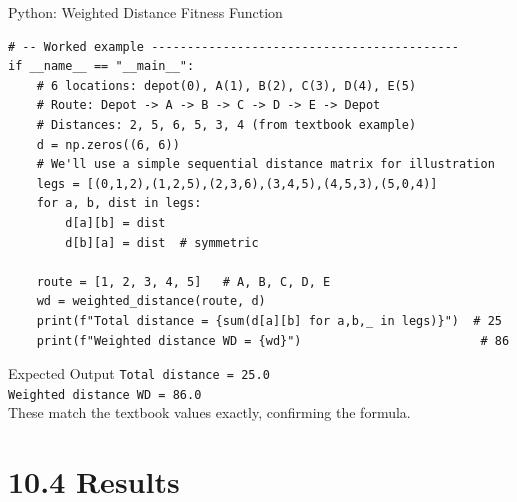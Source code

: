 \documentclass[aspectratio=169,10pt]{beamer}
\begin{document}
\begin{frame}[fragile]{Python: Weighted Distance Fitness Function}
\begin{lstlisting}[style=python,
    caption={Python: computing the weighted-distance fitness.},
    label={lst:python_wd}]
# -- Worked example -------------------------------------------
if __name__ == "__main__":
    # 6 locations: depot(0), A(1), B(2), C(3), D(4), E(5)
    # Route: Depot -> A -> B -> C -> D -> E -> Depot
    # Distances: 2, 5, 6, 5, 3, 4 (from textbook example)
    d = np.zeros((6, 6))
    # We'll use a simple sequential distance matrix for illustration
    legs = [(0,1,2),(1,2,5),(2,3,6),(3,4,5),(4,5,3),(5,0,4)]
    for a, b, dist in legs:
        d[a][b] = dist
        d[b][a] = dist  # symmetric

    route = [1, 2, 3, 4, 5]   # A, B, C, D, E
    wd = weighted_distance(route, d)
    print(f"Total distance = {sum(d[a][b] for a,b,_ in legs)}")  # 25
    print(f"Weighted distance WD = {wd}")                         # 86
\end{lstlisting}

  \begin{exampleblock}{Expected Output}
    \texttt{Total distance = 25.0} \\
    \texttt{Weighted distance WD = 86.0} \\
    These match the textbook values exactly, confirming the formula.
  \end{exampleblock}

\end{frame}

\section{10.4 Results}
\end{document}
